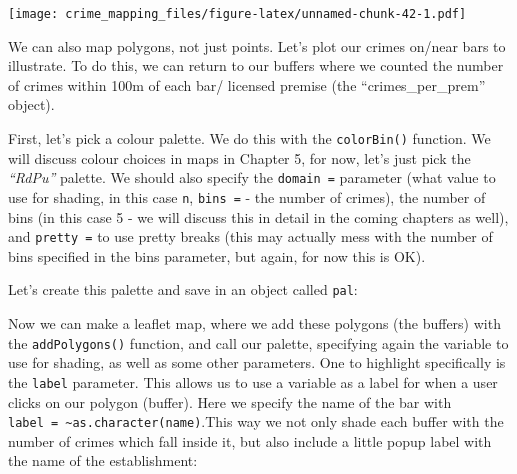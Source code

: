 \documentclass[
]{book}
\newenvironment{Shaded}{\begin{snugshade}}{\end{snugshade}}
\newcommand{\AttributeTok}[1]{\textcolor[rgb]{0.77,0.63,0.00}{#1}}
\newcommand{\ConstantTok}[1]{\textcolor[rgb]{0.00,0.00,0.00}{#1}}
\newcommand{\DecValTok}[1]{\textcolor[rgb]{0.00,0.00,0.81}{#1}}
\newcommand{\FunctionTok}[1]{\textcolor[rgb]{0.00,0.00,0.00}{#1}}
\newcommand{\NormalTok}[1]{#1}
\newcommand{\OtherTok}[1]{\textcolor[rgb]{0.56,0.35,0.01}{#1}}
\newcommand{\SpecialCharTok}[1]{\textcolor[rgb]{0.00,0.00,0.00}{#1}}
\newcommand{\StringTok}[1]{\textcolor[rgb]{0.31,0.60,0.02}{#1}}
\begin{document}
\texttt{[image: crime\_mapping\_files/figure-latex/unnamed-chunk-42-1.pdf]}

We can also map polygons, not just points. Let's plot our crimes on/near bars to illustrate. To do this, we can return to our buffers where we counted the number of crimes within 100m of each bar/ licensed premise (the ``crimes\_per\_prem'' object).

First, let's pick a colour palette. We do this with the \texttt{colorBin()} function. We will discuss colour choices in maps in Chapter 5, for now, let's just pick the \emph{``RdPu''} palette. We should also specify the \texttt{domain\ =} parameter (what value to use for shading, in this case \texttt{n}, \texttt{bins\ =} - the number of crimes), the number of bins (in this case 5 - we will discuss this in detail in the coming chapters as well), and \texttt{pretty\ =} to use pretty breaks (this may actually mess with the number of bins specified in the bins parameter, but again, for now this is OK).

Let's create this palette and save in an object called \texttt{pal}:

\begin{Shaded}
\end{Shaded}

Now we can make a leaflet map, where we add these polygons (the buffers) with the \texttt{addPolygons()} function, and call our palette, specifying again the variable to use for shading, as well as some other parameters. One to highlight specifically is the \texttt{label} parameter. This allows us to use a variable as a label for when a user clicks on our polygon (buffer). Here we specify the name of the bar with \texttt{label\ =\ \textasciitilde{}as.character(name)}.This way we not only shade each buffer with the number of crimes which fall inside it, but also include a little popup label with the name of the establishment:
\end{document}
